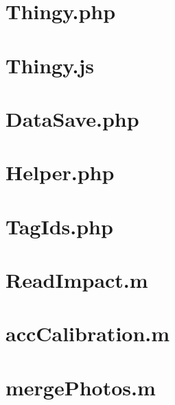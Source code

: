 \section{Thingy.php}\label{cd:Thingy.php}


\section{Thingy.js}\label{cd:Thingy.js}


\section{DataSave.php}\label{cd:DataSave.php}


\section{Helper.php}\label{cd:Helper.php}


\section{TagIds.php}\label{cd:TagIds.php}


\section{ReadImpact.m}\label{cd:readImpact}


\section{accCalibration.m}\label{cd:accCalibration}


\section{mergePhotos.m}\label{cd:mergePhotos}
